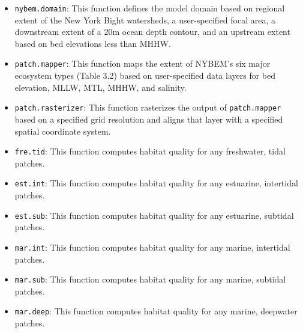 \documentclass[
]{book}
\providecommand{\tightlist}{%
  \setlength{\itemsep}{0pt}\setlength{\parskip}{0pt}}
\begin{document}
\begin{itemize}
\tightlist
\item
  \texttt{nybem.domain}: This function defines the model domain based on regional extent of the New York Bight watersheds, a user-specified focal area, a downstream extent of a 20m ocean depth contour, and an upstream extent based on bed elevations less than MHHW.\\
\item
  \texttt{patch.mapper}: This function maps the extent of NYBEM's six major ecosystem types (Table 3.2) based on user-specified data layers for bed elevation, MLLW, MTL, MHHW, and salinity.\\
\item
  \texttt{patch.rasterizer}: This function rasterizes the output of \texttt{patch.mapper} based on a specified grid resolution and aligns that layer with a specified spatial coordinate system.\\
\item
  \texttt{fre.tid}: This function computes habitat quality for any freshwater, tidal patches.\\
\item
  \texttt{est.int}: This function computes habitat quality for any estuarine, intertidal patches.\\
\item
  \texttt{est.sub}: This function computes habitat quality for any estuarine, subtidal patches.\\
\item
  \texttt{mar.int}: This function computes habitat quality for any marine, intertidal patches.\\
\item
  \texttt{mar.sub}: This function computes habitat quality for any marine, subtidal patches.\\
\item
  \texttt{mar.deep}: This function computes habitat quality for any marine, deepwater patches.
\end{itemize}
\end{document}
